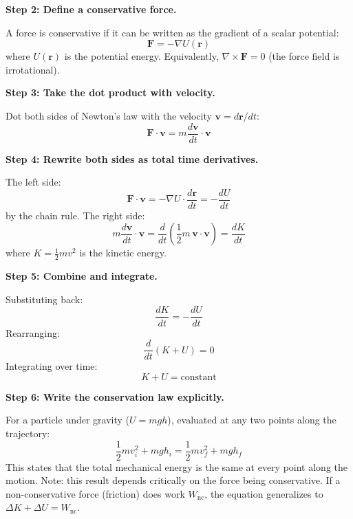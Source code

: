 \textbf{Step 2: Define a conservative force.}

A force is conservative if it can be written as the gradient of a scalar potential:
\begin{equation}
\mathbf{F} = -\nabla U(\mathbf{r})
\end{equation}
where $U(\mathbf{r})$ is the potential energy. Equivalently, $\nabla \times \mathbf{F} = 0$ (the force field is irrotational).

\textbf{Step 3: Take the dot product with velocity.}

Dot both sides of Newton's law with the velocity $\mathbf{v} = d\mathbf{r}/dt$:
\begin{equation}
\mathbf{F} \cdot \mathbf{v} = m\frac{d\mathbf{v}}{dt} \cdot \mathbf{v}
\end{equation}

\textbf{Step 4: Rewrite both sides as total time derivatives.}

The left side:
\begin{equation}
\mathbf{F} \cdot \mathbf{v} = -\nabla U \cdot \frac{d\mathbf{r}}{dt} = -\frac{dU}{dt}
\end{equation}
by the chain rule. The right side:
\begin{equation}
m\frac{d\mathbf{v}}{dt} \cdot \mathbf{v} = \frac{d}{dt}\left(\frac{1}{2}m\,\mathbf{v} \cdot \mathbf{v}\right) = \frac{dK}{dt}
\end{equation}
where $K = \frac{1}{2}mv^2$ is the kinetic energy.

\textbf{Step 5: Combine and integrate.}

Substituting back:
\begin{equation}
\frac{dK}{dt} = -\frac{dU}{dt}
\end{equation}
Rearranging:
\begin{equation}
\frac{d}{dt}(K + U) = 0
\end{equation}
Integrating over time:
\begin{equation}
K + U = \text{constant}
\end{equation}

\textbf{Step 6: Write the conservation law explicitly.}

For a particle under gravity ($U = mgh$), evaluated at any two points along the trajectory:
\begin{equation}
\boxed{\frac{1}{2}mv_i^2 + mgh_i = \frac{1}{2}mv_f^2 + mgh_f}
\end{equation}
This states that the total mechanical energy is the same at every point along the motion. Note: this result depends critically on the force being conservative. If a non-conservative force (friction) does work $W_{\text{nc}}$, the equation generalizes to $\Delta K + \Delta U = W_{\text{nc}}$.

